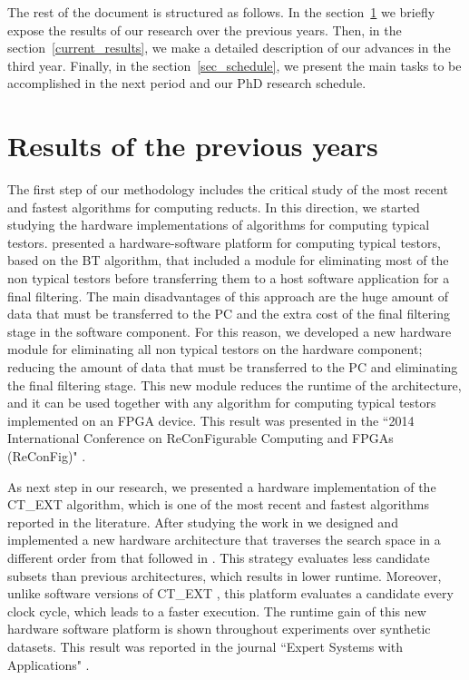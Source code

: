 \documentclass[authoryear,11pt]{elsarticle}
\begin{document}
  The rest of the document is structured as follows. In the section~\ref{previous_results} we briefly expose the results of our research over the previous years. Then, in the section~\ref{current_results}, we make a detailed description of our advances in the third year. Finally, in the section~\ref{sec_schedule}, we present the main tasks to be accomplished in the next period and our PhD research schedule.
  
  \section{Results of the previous years}\label{previous_results}
  
  The first step of our methodology includes the critical study of the most recent and fastest algorithms for computing reducts. In this direction, we started studying the hardware implementations of algorithms for computing typical testors. \cite{Rojas12} presented a hardware-software platform for computing typical testors, based on the BT algorithm, that included a module for eliminating most of the non typical testors before transferring them to a host software application for a final filtering. The main disadvantages of this approach are the huge amount of data that must be transferred to the PC and the extra cost of the final filtering stage in the software component.  For this reason, we developed a new hardware module for eliminating all non typical testors on the hardware	component; reducing the amount of data that must be transferred to the PC and eliminating the final filtering	stage. 	This new module reduces the runtime of the architecture, and it can be used together with any algorithm for computing typical testors implemented on an FPGA device. This result was presented in the ``2014 International Conference on ReConFigurable Computing and FPGAs (ReConFig)"  \citep{Rodriguez14}. 
  
  As next step in our research, we presented a hardware implementation of the CT\_EXT algorithm, which is one of the most recent and fastest algorithms reported in the literature. After studying the work in \citep{Rojas12} we designed and implemented a new hardware architecture that traverses the search space in a different order from that followed in \citep{Rojas07, Rojas12,Rodriguez14}. This strategy evaluates less	candidate subsets than previous architectures, which results in lower runtime. Moreover, unlike software versions of CT\_EXT \citep{Sanchez07, Sanchez10}, this platform evaluates a candidate every clock cycle, which leads to a faster execution. The runtime gain of this new hardware software platform is shown throughout experiments over synthetic datasets. This result was reported in the journal ``Expert Systems with Applications"  \citep{Rodriguez15}.
  
\end{document}
